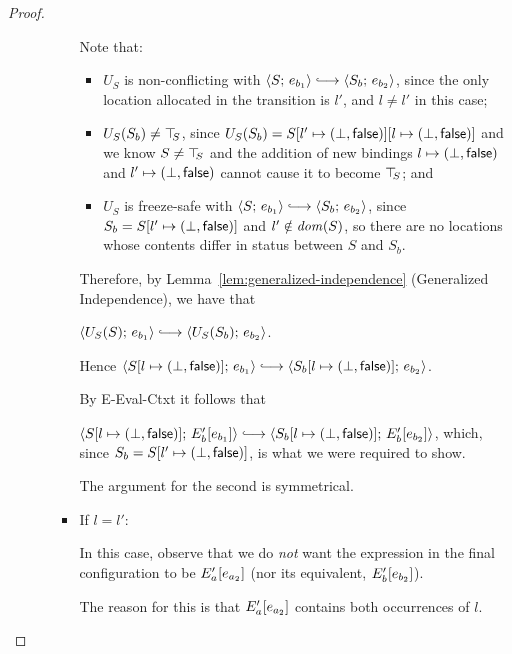 \begin{proof}
\begin{enumerate}
\begin{enumerate}
\begin{itemize}
        Note that:
        \begin{itemize}
        \item $U_S$ is non-conflicting with $\config{S}{e_{b_1}}
          \parstepsto \config{S_b}{e_{b_2}}$, since the only
          location allocated in the transition is $l'$, and $l
          \neq l'$ in this case;
        \item $U_S(S_b) \neq \top\hspace{-0.85mm}_{S}$, since $U_S(S_b) =
          S[l' \mapsto (\bot, \textsf{false})][l \mapsto (\bot, \textsf{false})]$
          and we know $S \neq \top\hspace{-0.85mm}_{S}$ and the addition of new
          bindings $l \mapsto (\bot, \textsf{false})$ and
          $l' \mapsto (\bot, \textsf{false})$ cannot cause it to
          become $\top\hspace{-0.85mm}_{S}$; and
        \item $U_S$ is freeze-safe with $\config{S}{e_{b_1}}
          \parstepsto \config{S_b}{e_{b_2}}$, since $S_b =
          S[l' \mapsto (\bot, \textsf{false})]$ and $l' \notin \mathit{dom}(S)$,
          so there are no locations whose contents differ in status
          between $S$ and $S_b$.
        \end{itemize}

        Therefore, by Lemma~\ref{lem:generalized-independence}
        (Generalized Independence), we have that

        $\config{U_S(S)}{e_{b_1}} \parstepsto
        \config{U_S(S_b)}{e_{b_2}}$.

        Hence $\config{\extS{S}{l}{\bot}{\frozenfalse}}{e_{b_1}}
        \parstepsto
        \config{\extS{S_b}{l}{\bot}{\frozenfalse}}{e_{b_2}}$.

        By {\sc E-Eval-Ctxt} it follows that

        $\config{\extS{S}{l}{\bot}{\frozenfalse}}{\evalctxt{E'_b}{e_{b_1}}}
        \parstepsto
        \config{\extS{S_b}{l}{\bot}{\frozenfalse}}{\evalctxt{E'_b}{e_{b_2}}}$,
        which, since $S_b = S[l' \mapsto (\bot, \textsf{false})]$, is what
        we were required to show.

        The argument for the second is symmetrical.

      \item If $l = l'$:

        In this case, observe that we do \emph{not} want the
        expression in the final configuration to be
        $E'_a\hspace{-0.5mm}\left[e_{a_2}\right]$ (nor its equivalent,
        $E'_b\hspace{-0.5mm}\left[e_{b_2}\right]$).

        The reason for this is that $E'_a\hspace{-0.5mm}\left[e_{a_2}\right]$
        contains both occurrences of $l$.


\end{itemize}
\end{enumerate}
\end{enumerate}
\end{proof}
